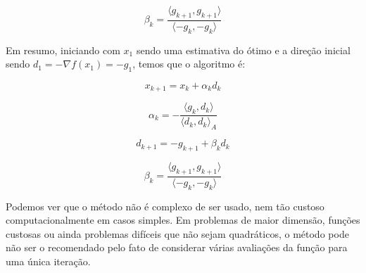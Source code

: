 \begin{equation}
\beta_k = \frac{\langle g_{k+1}, g_{k+1} \rangle}{\langle -g_{k}, - g_k \rangle}
\end{equation}

Em resumo, iniciando com \(x_1\) sendo uma estimativa do ótimo e a direção inicial sendo \(d_1 = -\nabla f(x_1) = -g_1\), temos que o algoritmo é:

\begin{equation}
x_{k+1} = x_k + \alpha_k d_k
\end{equation}

\begin{equation}
\alpha_k= - \frac{\langle g_k, d_k \rangle}{\langle d_k, d_k \rangle_A}
\end{equation}

\begin{equation}
d_{k+1} = -g_{k+1} + \beta_k d_k
\end{equation}

\begin{equation}
\beta_k = \frac{\langle g_{k+1}, g_{k+1} \rangle}{\langle -g_{k}, - g_k \rangle}
\end{equation}

Podemos ver que o método não é complexo de ser usado, nem tão custoso computacionalmente em casos simples.
Em problemas de maior dimensão, funções custosas ou ainda problemas difíceis que não sejam quadráticos, o
método pode não ser o recomendado pelo fato de considerar várias avaliações da função para uma única iteração.